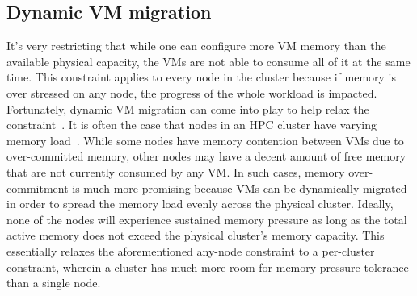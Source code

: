 \subsection{Dynamic VM migration}
It's very restricting that while one can configure more VM memory than the available physical capacity, the VMs are not able to consume all of it 
at the same time. This constraint applies to every node in the cluster because if memory is over stressed on any 
node, the progress of the whole workload is impacted. 
Fortunately, dynamic VM migration can come into play to help relax the constraint~\cite{KannigaDevi2018,infrastructure2006resource}. 
It is often the case that nodes in an HPC cluster have varying memory load~\cite{gupta2013improving,boneti2008dynamic}. While some nodes have memory contention 
between VMs due to over-committed memory, other nodes may have a decent amount of free memory that are not currently consumed by any VM. In such cases, memory over-commitment 
is much more promising because VMs can be dynamically migrated 
in order to  
spread the memory load evenly across the physical cluster. Ideally, none of the nodes will experience sustained memory pressure as long as 
the total active memory does not exceed the physical cluster's memory capacity. This essentially relaxes the aforementioned  
any-node constraint to a per-cluster constraint, wherein a cluster has much more room for memory pressure tolerance than a single node. 
